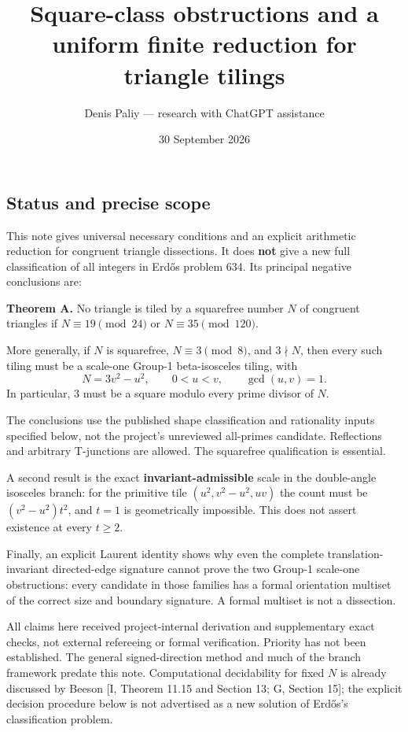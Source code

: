 \documentclass[
  11pt,
]{article}
\title{Square-class obstructions and a uniform finite reduction for
triangle tilings}
\author{Denis Paliy --- research with ChatGPT assistance}
\date{30 September 2026}
\begin{document}
\maketitle

\subsection{Status and precise scope}\label{status-and-precise-scope}

This note gives universal necessary conditions and an explicit
arithmetic reduction for congruent triangle dissections. It does
\textbf{not} give a new full classification of all integers in Erdős
problem 634. Its principal negative conclusions are:

\textbf{Theorem A.} No triangle is tiled by a squarefree number \(N\) of
congruent triangles if \(N\equiv19\pmod{24}\) or
\(N\equiv35\pmod{120}\).

More generally, if \(N\) is squarefree, \(N\equiv3\pmod8\), and
\(3\nmid N\), then every such tiling must be a scale-one Group-1
beta-isosceles tiling, with
\[N=3v^2-u^2,\qquad 0<u<v,\qquad \gcd(u,v)=1.\] In particular, \(3\)
must be a square modulo every prime divisor of \(N\).

The conclusions use the published shape classification and rationality
inputs specified below, not the project's unreviewed all-primes
candidate. Reflections and arbitrary T-junctions are allowed. The
squarefree qualification is essential.

A second result is the exact \textbf{invariant-admissible} scale in the
double-angle isosceles branch: for the primitive tile
\((u^2,v^2-u^2,uv)\) the count must be \((v^2-u^2)t^2\), and \(t=1\) is
geometrically impossible. This does not assert existence at every
\(t\ge2\).

Finally, an explicit Laurent identity shows why even the complete
translation-invariant directed-edge signature cannot prove the two
Group-1 scale-one obstructions: every candidate in those families has a
formal orientation multiset of the correct size and boundary signature.
A formal multiset is not a dissection.

All claims here received project-internal derivation and supplementary
exact checks, not external refereeing or formal verification. Priority
has not been established. The general signed-direction method and much
of the branch framework predate this note. Computational decidability
for fixed \(N\) is already discussed by Beeson {[}I, Theorem 11.15 and
Section 13; G, Section 15{]}; the explicit decision procedure below is
not advertised as a new solution of Erdős's classification problem.
\end{document}
